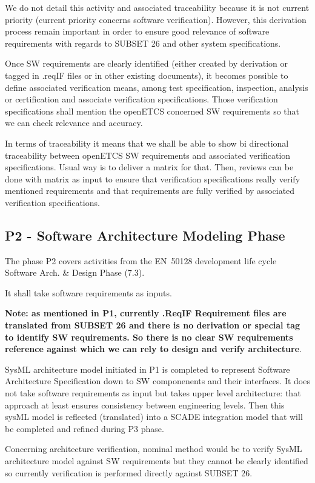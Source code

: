\documentclass[11pt]{template/openetcs_report}
\begin{document}
We do not detail this activity and associated traceability because it is not current priority (current priority concerns software verification). However, this derivation process remain important in order to ensure good relevance of software requirements with regards to SUBSET 26 and other system specifications.

Once SW requirements are clearly identified (either created by derivation or tagged in .reqIF files or in other existing documents), it becomes possible to define associated verification means, among test specification, inspection, analysis or certification and associate verification specifications. Those verification specifications shall mention the openETCS concerned SW requirements so that we can check relevance and accuracy. 

In terms of traceability it means that we shall be able to show bi directional traceability between openETCS SW requirements and associated verification specifications. Usual way is to deliver a matrix for that.
Then, reviews can be done with matrix as input to ensure that verification specifications really verify mentioned requirements and that requirements are fully verified by associated verification specifications.
 

\subsection{P2 - Software Architecture Modeling Phase}
The phase P2 covers activities from the EN~50128 development life cycle Software Arch. \& Design Phase (7.3).

It shall take software requirements as inputs.

\textbf{Note: as mentioned in P1, currently .ReqIF Requirement files are translated from SUBSET 26 and there is no derivation or special tag to identify SW requirements. So there is no clear SW requirements reference against which we can rely to design and verify architecture}.

SysML architecture model initiated in P1 is completed to represent Software Architecture Specification down to SW componenents and their interfaces. It does not take software requirements as input but takes upper level architecture: that approach at least ensures consistency between engineering levels.
Then this sysML model is reflected (translated) into a SCADE integration model that will be completed and refined during P3 phase. 

Concerning architecture verification, nominal method would be to verify SysML architecture model against SW requirements but they cannot be clearly identified so currently verification is performed directly against SUBSET 26.
\end{document}
